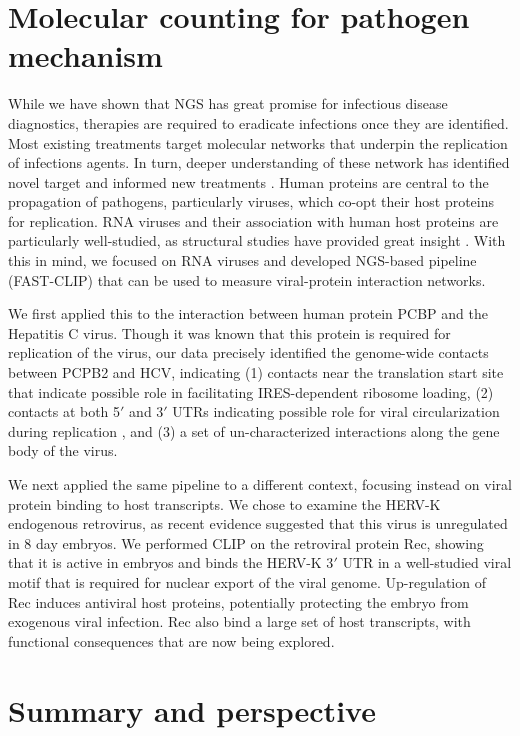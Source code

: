 \section{Molecular counting for pathogen mechanism}

While we have shown that NGS has great promise for infectious disease diagnostics, therapies are required to eradicate infections once they are identified. Most existing treatments target molecular networks that underpin the replication of infections agents. In turn, deeper understanding of these network has identified novel target and informed new treatments \cite{Wilson:2014baa}. Human proteins are central to the propagation of pathogens, particularly viruses, which co-opt their host proteins for replication. RNA viruses and their association with human host proteins are particularly well-studied, as structural studies have provided great insight \cite{Fraser:2006kn}. With this in mind, we focused on RNA viruses and developed NGS-based pipeline (FAST-CLIP) that can be used to measure viral-protein interaction networks. 

We first applied this to the interaction between human protein PCBP and the Hepatitis C virus. Though it was known that this protein is required for replication of the virus, our data precisely identified the genome-wide contacts between PCPB2 and HCV, indicating (1) contacts near the translation start site that indicate possible role in facilitating IRES-dependent ribosome loading, (2) contacts at both 5$'$ and 3$'$ UTRs indicating possible role for viral circularization during replication \cite{GarciaSastre:2013ko}, and (3) a set of un-characterized interactions along the gene body of the virus. 

We next applied the same pipeline to a different context, focusing instead on viral protein binding to host transcripts. We chose to examine the HERV-K endogenous retrovirus, as recent evidence suggested that this virus is unregulated in 8 day embryos. We performed CLIP on the retroviral protein Rec, showing that it is active in embryos and binds the HERV-K 3$'$ UTR in a well-studied viral motif that is required for nuclear export of the viral genome. Up-regulation of Rec induces antiviral host proteins, potentially protecting the embryo from exogenous viral infection. Rec also bind a large set of host transcripts, with functional consequences that are now being explored.  

\section{Summary and perspective}

